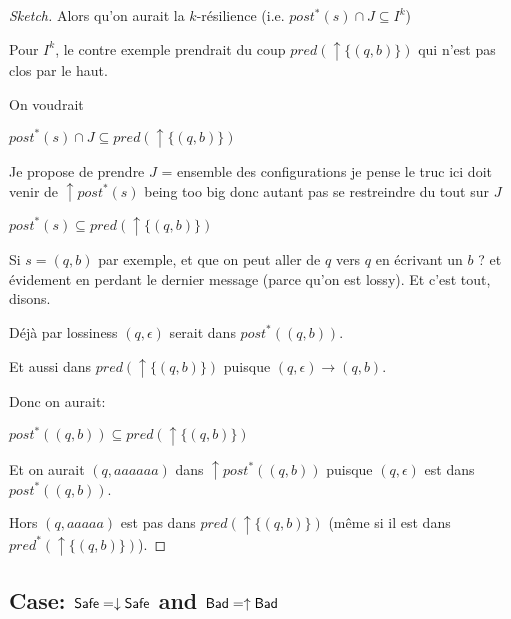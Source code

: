 \begin{proof}[Sketch]
{Alors qu'on aurait la $k$-résilience (i.e. $post^* (s) \cap J \subseteq I^k$)

Pour $I^k$, le contre exemple prendrait du coup $pred(\uparrow \{ (q,b)\})$ qui n'est pas clos par le haut.

On voudrait

$post^*(s) \cap J \subseteq pred(\uparrow \{ (q,b)\})$


Je propose de prendre $J$ = ensemble des configurations je pense le truc ici doit venir de
$\uparrow post^* (s)$ being too big
donc autant pas se restreindre du tout sur $J$


$post^*(s) \subseteq pred(\uparrow \{ (q,b)\})$

Si $s=(q,b)$ par exemple, et que on peut aller de $q$ vers $q$ en écrivant un 
$b$ ? et évidement en perdant le dernier message (parce qu'on est lossy). Et c'est tout, disons.

Déjà par lossiness $(q,\epsilon)$ serait dans $post^*((q,b))$.

Et aussi dans $pred(\uparrow \{ (q,b)\})$ puisque $(q,\epsilon) \to (q,b)$.

Donc on aurait:

$post^*((q,b))  \subseteq pred(\uparrow \{ (q,b)\})$

Et on aurait $(q,aaaaaa)$ dans 
$\uparrow post^* ((q,b))$ puisque $(q,\epsilon)$ est dans $post^* ((q,b))$.

Hors $(q,aaaaa)$ est pas dans $pred(\uparrow \{ (q,b)\})$
(même si il est dans $pred^*(\uparrow \{ (q,b)\})$).

}
\fi 
 
\end{proof}


\iffalse
\begin{proposition}
\textcolor{red}{
{\sc bounded resilience} is undecidable for WSTS with upward compatibility with an effective basis of $post^*$.
CONJECTURE
}
\end{proposition}

\begin{proof}
 \textcolor{red}{pas certain ! à faire Mathieu}
\end{proof}
\fi


\subsection{Case: $\textsf{Safe} = \downarrow \textsf{Safe}$ and $\textsf{Bad} = \uparrow \textsf{Bad}$}


